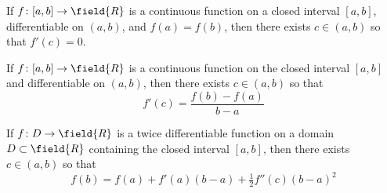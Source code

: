 





\begin{theorem}\label{theorem:Rolle}
If $f\colon [a,b] \to \field{R}$ is a continuous function on a closed interval $[a,b]$, differentiable on $(a,b)$, and $f(a) = f(b)$, then there exists $c \in (a,b)$ so that $f'(c)=0$.
\end{theorem}

\begin{theorem}\label{theorem:MVT}
If $f\colon [a,b] \to \field{R}$ is a continuous function on the closed interval $[a,b]$ and differentiable on $(a,b)$, then there exists $c \in (a,b)$ so that
\begin{equation*}
f'(c) = \frac{f(b)-f(a)}{b-a}
\end{equation*}
\end{theorem}

\begin{theorem}\label{theorem:ELM}
If $f\colon D \to \field{R}$ is a twice differentiable function on a domain $D \subset \field{R}$ containing the closed interval $[a,b]$, then there exists $c \in (a,b)$ so that 
\begin{equation*}
f(b) = f(a) + f'(a)(b-a) + \tfrac{1}{2}f''(c)(b-a)^2
\end{equation*}
\end{theorem}

